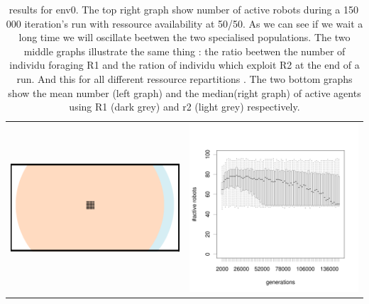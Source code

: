 \documentclass[a4paper,10pt]{article}
\begin{document}
\begin{table}[h!]
 \caption{results for env0. \newline 
 The top right graph show number of active robots during a 150\,000 iteration's run with ressource availability at 50/50. As we can see if we wait a long time we will oscillate beetwen the two specialised populations. 
 \newline The two middle graphs illustrate the same thing : the ratio beetwen the number of individu foraging R1 and the ration of individu which exploit R2 at the end of a run. And this for all different ressource repartitions .
 \newline The two bottom graphs show the mean number (left graph) and the median(right graph) of active agents using R1 (dark grey) and r2 (light grey) respectively.}
 \centering
 \begin{tabular}{cc}
 \includegraphics[width=\imgSize]{images/5StaticEnv/environments/staticEnv0}&\includegraphics[width=\imgSize]{images/5StaticEnv/alive_staticEnv0}\\

\end{tabular}
\end{table}
\end{document}

